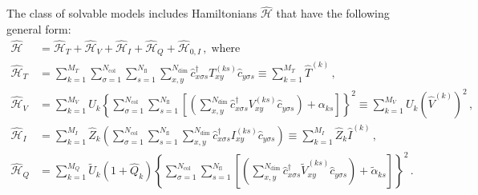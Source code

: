 The class of solvable models includes  Hamiltonians $\hat{\mathcal{H}}$ that have the following general form:
\begin{align}
\hat{\mathcal{H}}
&=
\hat{\mathcal{H}}_{T}+\hat{\mathcal{H}}_{V} +  \hat{\mathcal{H}}_{I} +   \hat{\mathcal{H}}_{Q}  + \hat{\mathcal{H}}_{0,I}\,,\;\text{where}
\label{eqn:general_ham}\\
\hat{\mathcal{H}}_{T}
&=
\sum\limits_{k=1}^{M_T}
\sum\limits_{\sigma=1}^{N_{\mathrm{col}}}
\sum\limits_{s=1}^{N_{\mathrm{fl}}}
\sum\limits_{x,y}^{N_{\mathrm{dim}}}
\hat{c}^{\dagger}_{x \sigma   s}T_{xy}^{(k s)} \hat{c}^{\phantom\dagger}_{y \sigma s}  \equiv  \sum\limits_{k=1}^{M_T} \hat{T}^{(k)}
\label{eqn:general_ham_t}\,,\\
\hat{\mathcal{H}}_{V}
&=
\sum\limits_{k=1}^{M_V}U_{k}
\left\{
\sum\limits_{\sigma=1}^{N_{\mathrm{col}}}
\sum\limits_{s=1}^{N_{\mathrm{fl}}}
\left[
\left(
\sum\limits_{x,y}^{N_{\mathrm{dim}}}
\hat{c}^{\dagger}_{x \sigma s}V_{xy}^{(k s)}\hat{c}^{\phantom\dagger}_{y \sigma s}
\right)
+\alpha_{k s} 
\right]
\right\}^{2}  \equiv   
\sum\limits_{k=1}^{M_V}U_{k}   \left(\hat{V}^{(k)} \right)^2
\label{eqn:general_ham_v}\,,\\
\hat{\mathcal{H}}_{I}
& = 
\sum\limits_{k=1}^{M_I} \hat{Z}_{k} 
\left(
\sum\limits_{\sigma=1}^{N_{\mathrm{col}}}
\sum\limits_{s=1}^{N_{\mathrm{fl}}}
\sum\limits_{x,y}^{N_{\mathrm{dim}}}
\hat{c}^{\dagger}_{x \sigma s} I_{xy}^{(k s)}\hat{c}^{\phantom\dagger}_{y \sigma s}
\right) \equiv \sum\limits_{k=1}^{M_I} \hat{Z}_{k}    \hat{I}^{(k)} 
\, ,\label{eqn:general_ham_i} \, \\
\hat{\mathcal{H}}_{Q}
& = 
\sum\limits_{k=1}^{M_Q} \tilde{U}_{k} \left( 1 +  \hat{Q}_k \right) 
 \left\{
\sum\limits_{\sigma=1}^{N_{\mathrm{col}}}
\sum\limits_{s=1}^{N_{\mathrm{fl}}}
\left[
\left(
\sum\limits_{x,y}^{N_{\mathrm{dim}}}
\hat{c}^{\dagger}_{x \sigma s}\tilde{V}_{xy}^{(k s)}\hat{c}^{\phantom\dagger}_{y \sigma s}
\right)
+\tilde{\alpha}_{k s} 
\right]
\right\}^{2} 
\,.\label{eqn:general_ham_Q}
\end{align}

